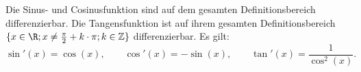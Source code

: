 Die Sinus- und Cosinusfunktion sind auf dem gesamten Definitionsbereich differenzierbar. Die Tangensfunktion ist auf ihrem gesamten Definitionsbereich $\{x \in \R; x \neq \frac{\pi}{2}+k \cdot \pi; k \in \mathbb{Z}\}$ differenzierbar. Es gilt:
$$
\sin'(x) = \cos(x),
\qquad
\cos'(x) = -\sin(x),
\qquad
\tan'(x) = \frac{1}{\cos^2(x)}.
$$
